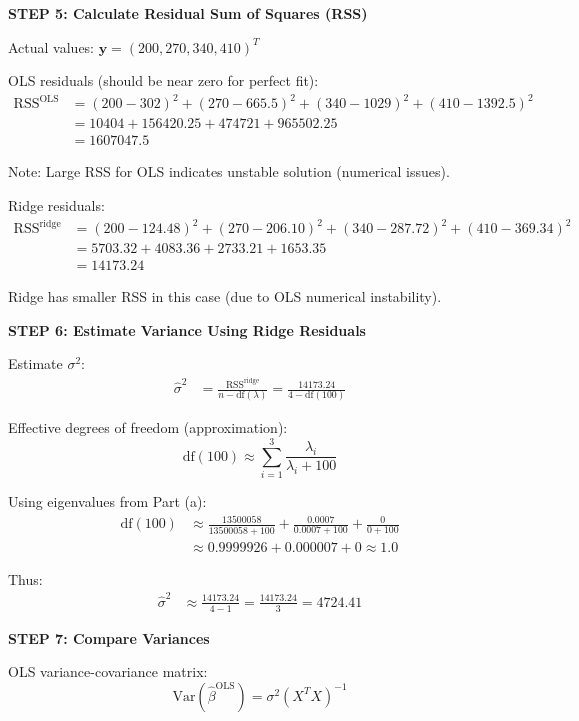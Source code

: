 \documentclass[12pt]{article}
\begin{document}
\begin{solution}
\textbf{STEP 5: Calculate Residual Sum of Squares (RSS)}

Actual values: $\mathbf{y} = (200, 270, 340, 410)^T$

OLS residuals (should be near zero for perfect fit):
\begin{align*}
\text{RSS}^{\text{OLS}} &= (200-302)^2 + (270-665.5)^2 + (340-1029)^2 + (410-1392.5)^2 \\
&= 10404 + 156420.25 + 474721 + 965502.25 \\
&= 1607047.5
\end{align*}

Note: Large RSS for OLS indicates unstable solution (numerical issues).

Ridge residuals:
\begin{align*}
\text{RSS}^{\text{ridge}} &= (200-124.48)^2 + (270-206.10)^2 + (340-287.72)^2 + (410-369.34)^2 \\
&= 5703.32 + 4083.36 + 2733.21 + 1653.35 \\
&= 14173.24
\end{align*}

Ridge has smaller RSS in this case (due to OLS numerical instability).

\textbf{STEP 6: Estimate Variance Using Ridge Residuals}

Estimate $\sigma^2$:
\begin{align*}
\hat{\sigma}^2 &= \frac{\text{RSS}^{\text{ridge}}}{n - \text{df}(\lambda)} = \frac{14173.24}{4 - \text{df}(100)}
\end{align*}

Effective degrees of freedom (approximation):
\[\text{df}(100) \approx \sum_{i=1}^{3} \frac{\lambda_i}{\lambda_i + 100}\]

Using eigenvalues from Part (a):
\begin{align*}
\text{df}(100) &\approx \frac{13500058}{13500058 + 100} + \frac{0.0007}{0.0007 + 100} + \frac{0}{0 + 100} \\
&\approx 0.9999926 + 0.000007 + 0 \approx 1.0
\end{align*}

Thus:
\begin{align*}
\hat{\sigma}^2 &\approx \frac{14173.24}{4 - 1} = \frac{14173.24}{3} = 4724.41
\end{align*}

\textbf{STEP 7: Compare Variances}

OLS variance-covariance matrix:
\[\text{Var}(\hat{\beta}^{\text{OLS}}) = \sigma^2(X^TX)^{-1}\]


\end{solution}
\end{document}
